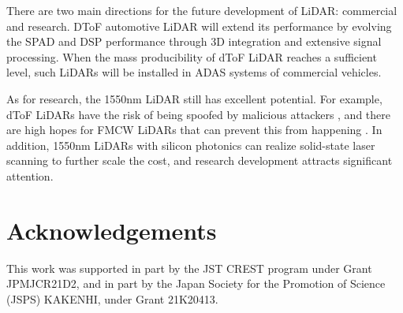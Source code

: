 \documentclass[paper]{ieice}
\begin{document}
There are two main directions for the future development of LiDAR: commercial and research. DToF automotive LiDAR will extend its performance by evolving the SPAD and DSP performance through 3D integration and extensive signal processing. When the mass producibility of dToF LiDAR reaches a sufficient level, such LiDARs will be installed in ADAS systems of commercial vehicles.

As for research, the 1550nm LiDAR still has excellent potential. For example, dToF LiDARs have the risk of being spoofed by malicious attackers \cite{sun2020towards, cao2019adversarial}, and there are high hopes for FMCW LiDARs that can prevent this from happening \cite{aptivpatent}. In addition, 1550nm LiDARs with silicon photonics can realize solid-state laser scanning to further scale the cost, and research development attracts significant attention\cite{poulton2017coherent}.




\section*{Acknowledgements}
This work was supported in part by the JST CREST program under Grant JPMJCR21D2, and in part by the Japan Society for the Promotion of Science (JSPS) KAKENHI, under Grant 21K20413.
\end{document}
